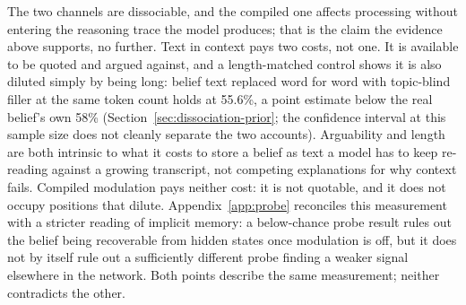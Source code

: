 The two channels are dissociable, and the compiled one affects processing without
entering the reasoning trace the model produces; that is the claim the evidence above
supports, no further. Text in context pays two costs, not one. It is available to be
quoted and argued against, and a length-matched control shows it is also diluted simply
by being long: belief text replaced word for word with topic-blind filler at the same
token count holds at 55.6\%, a point estimate below the real belief's own 58\%
(Section~\ref{sec:dissociation-prior}; the confidence interval at this sample size does
not cleanly separate the two accounts). Arguability and length are both intrinsic to
what it costs to store a belief as text a model has to keep re-reading against a
growing transcript, not competing explanations for why context fails. Compiled
modulation pays neither cost: it is not quotable, and it does not occupy positions that
dilute. \iflongversion Appendix~\ref{app:probe} reconciles this measurement with a stricter reading of
implicit memory: a below-chance probe result rules out the belief being recoverable
from hidden states once modulation is off, but it does not by itself rule out a
sufficiently different probe finding a weaker signal elsewhere in the network. Both
points describe the same measurement; neither contradicts the other. \fi
